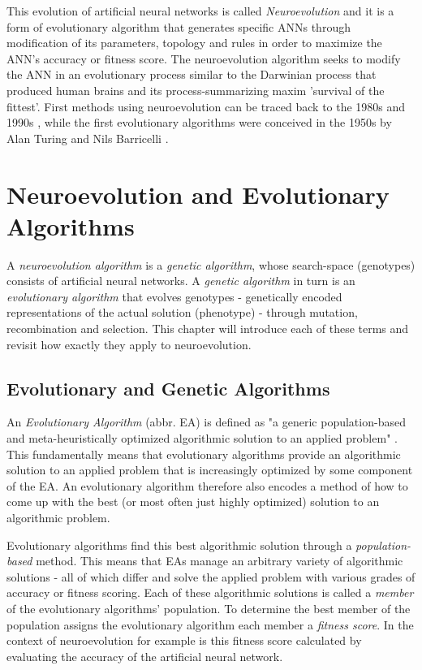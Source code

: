 \documentclass[journal, a4paper]{IEEEtran}
\begin{document}
This evolution of artificial neural networks is called \textit{Neuroevolution} and it is a form of evolutionary algorithm that generates specific ANNs through modification of its parameters, topology and rules in order to maximize the ANN's accuracy or fitness score. The neuroevolution algorithm seeks to modify the ANN in an evolutionary process similar to the Darwinian process that produced human brains and its process-summarizing maxim 'survival of the fittest'. First methods using neuroevolution can be traced back to the 1980s and 1990s \cite{fro18}, while the first evolutionary algorithms were conceived in the 1950s by Alan Turing and Nils Barricelli \cite{tur50}.




\section{Neuroevolution and Evolutionary Algorithms}

A \textit{neuroevolution algorithm} is a \textit{genetic algorithm}, whose search-space (genotypes) consists of artificial neural networks. A \textit{genetic algorithm} in turn is an \textit{evolutionary algorithm} that evolves genotypes - genetically encoded representations of the actual solution (phenotype) - through mutation, recombination and selection. This chapter will introduce each of these terms and revisit how exactly they apply to neuroevolution.



\subsection{Evolutionary and Genetic Algorithms}

An \textit{Evolutionary Algorithm} (abbr. EA) is defined as "a generic population-based and meta-heuristically optimized algorithmic solution to an applied problem" \cite{hol12}. This fundamentally means that evolutionary algorithms provide an algorithmic solution to an applied problem that is increasingly optimized by some component of the EA. An evolutionary algorithm therefore also encodes a method of how to come up with the best (or most often just highly optimized) solution to an algorithmic problem.

Evolutionary algorithms find this best algorithmic solution through a \textit{population-based} method. This means that EAs manage an arbitrary variety of algorithmic solutions - all of which differ and solve the applied problem with various grades of accuracy or fitness scoring. Each of these algorithmic solutions is called a \textit{member} of the evolutionary algorithms' population. To determine the best member of the population assigns the evolutionary algorithm each member a \textit{fitness score}. In the context of neuroevolution for example is this fitness score calculated by evaluating the accuracy of the artificial neural network.
\end{document}
